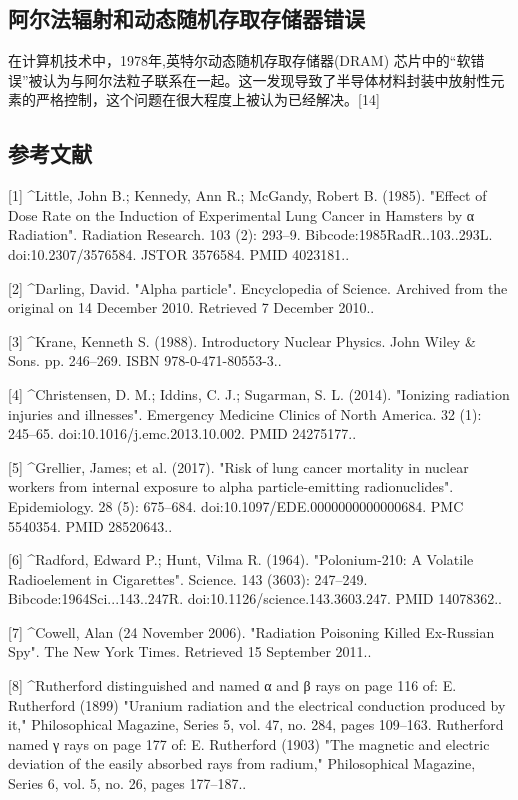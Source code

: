 \subsection{阿尔法辐射和动态随机存取存储器错误}
在计算机技术中，1978年,英特尔动态随机存取存储器(DRAM) 芯片中的“软错误”被认为与阿尔法粒子联系在一起。这一发现导致了半导体材料封装中放射性元素的严格控制，这个问题在很大程度上被认为已经解决。[14]

\subsection{参考文献}
[1]
^Little, John B.; Kennedy, Ann R.; McGandy, Robert B. (1985). "Effect of Dose Rate on the Induction of Experimental Lung Cancer in Hamsters by α Radiation". Radiation Research. 103 (2): 293–9. Bibcode:1985RadR..103..293L. doi:10.2307/3576584. JSTOR 3576584. PMID 4023181..

[2]
^Darling, David. "Alpha particle". Encyclopedia of Science. Archived from the original on 14 December 2010. Retrieved 7 December 2010..

[3]
^Krane, Kenneth S. (1988). Introductory Nuclear Physics. John Wiley & Sons. pp. 246–269. ISBN 978-0-471-80553-3..

[4]
^Christensen, D. M.; Iddins, C. J.; Sugarman, S. L. (2014). "Ionizing radiation injuries and illnesses". Emergency Medicine Clinics of North America. 32 (1): 245–65. doi:10.1016/j.emc.2013.10.002. PMID 24275177..

[5]
^Grellier, James; et al. (2017). "Risk of lung cancer mortality in nuclear workers from internal exposure to alpha particle-emitting radionuclides". Epidemiology. 28 (5): 675–684. doi:10.1097/EDE.0000000000000684. PMC 5540354. PMID 28520643..

[6]
^Radford, Edward P.; Hunt, Vilma R. (1964). "Polonium-210: A Volatile Radioelement in Cigarettes". Science. 143 (3603): 247–249. Bibcode:1964Sci...143..247R. doi:10.1126/science.143.3603.247. PMID 14078362..

[7]
^Cowell, Alan (24 November 2006). "Radiation Poisoning Killed Ex-Russian Spy". The New York Times. Retrieved 15 September 2011..

[8]
^Rutherford distinguished and named α and β rays on page 116 of: E. Rutherford (1899) "Uranium radiation and the electrical conduction produced by it," Philosophical Magazine, Series 5, vol. 47, no. 284, pages 109–163. Rutherford named γ rays on page 177 of: E. Rutherford (1903) "The magnetic and electric deviation of the easily absorbed rays from radium," Philosophical Magazine, Series 6, vol. 5, no. 26, pages 177–187..

